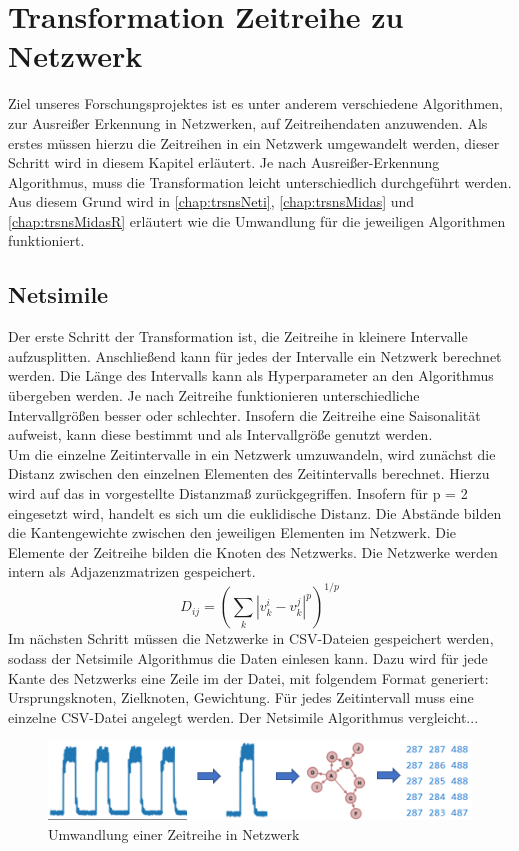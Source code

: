 \newpage
\chapter{Transformation Zeitreihe zu Netzwerk}
Ziel unseres Forschungsprojektes ist es unter anderem verschiedene Algorithmen, zur Ausreißer Erkennung in Netzwerken, auf Zeitreihendaten anzuwenden. Als erstes müssen hierzu die Zeitreihen in ein Netzwerk umgewandelt werden, dieser Schritt wird in diesem Kapitel erläutert. Je nach Ausreißer-Erkennung Algorithmus, muss die Transformation leicht unterschiedlich durchgeführt werden. Aus diesem Grund wird in \autoref{chap:trsnsNeti}, \autoref{chap:trsnsMidas} und \autoref{chap:trsnsMidasR} erläutert wie die Umwandlung für die jeweiligen Algorithmen funktioniert.
\section{Netsimile}
\label{chap:trsnsNeti}
Der erste Schritt der Transformation ist, die Zeitreihe in kleinere Intervalle aufzusplitten. Anschließend kann für jedes der Intervalle ein Netzwerk berechnet werden. Die Länge des Intervalls kann als Hyperparameter an den Algorithmus übergeben werden. Je nach Zeitreihe funktionieren unterschiedliche Intervallgrößen besser oder schlechter. Insofern die Zeitreihe eine Saisonalität aufweist, kann diese bestimmt und als Intervallgröße genutzt werden.
\\
Um die einzelne Zeitintervalle in ein Netzwerk umzuwandeln, wird zunächst die Distanz zwischen den einzelnen Elementen des Zeitintervalls berechnet. Hierzu wird auf das in \citep[vgl.][S.~2-3]{10.3389/fphy.2019.00194} vorgestellte Distanzmaß zurückgegriffen. Insofern für p = 2 eingesetzt wird, handelt es sich um die euklidische Distanz. Die Abstände bilden die Kantengewichte zwischen den jeweiligen Elementen im Netzwerk. Die Elemente der Zeitreihe bilden die Knoten des Netzwerks. Die Netzwerke werden intern als Adjazenzmatrizen gespeichert.
$$D_{ij}=\left(\sum_{k} \left|v_{k}^{i}-v_{k}^{j}\right|^{p}\right)^{1/p}$$
 Im nächsten Schritt müssen die Netzwerke in CSV-Dateien gespeichert werden, sodass der  Netsimile Algorithmus die Daten einlesen kann. Dazu wird für jede Kante des Netzwerks eine  Zeile im der Datei, mit folgendem Format generiert: Ursprungsknoten, Zielknoten, Gewichtung. Für jedes Zeitintervall muss eine einzelne CSV-Datei angelegt werden. Der Netsimile Algorithmus vergleicht...

\begin{figure}[H]
	\centering
	\includegraphics[width=13cm]{fig/tsToNet/tsToCsv}
	\caption{Umwandlung einer Zeitreihe in Netzwerk}
	\label{img:tsToNet}
\end{figure}



